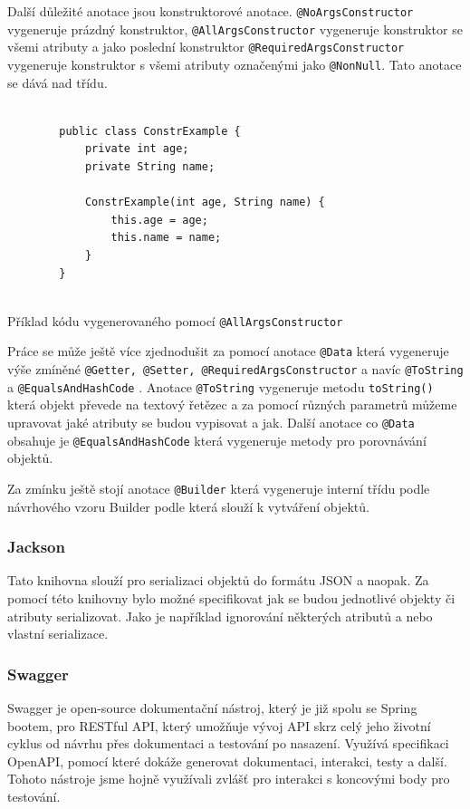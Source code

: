 Další důležité anotace jsou konstruktorové anotace. \texttt{@NoArgsConstructor} vygeneruje prázdný konstruktor, \texttt{@AllArgsConstructor} vygeneruje konstruktor se všemi atributy  a jako poslední konstruktor \texttt{@RequiredArgsConstructor} vygeneruje konstruktor s všemi atributy označenými jako \texttt{@NonNull}. Tato anotace se dává nad třídu. \cite{lombok:constructor} 

\begin{listing}[H]
    \begin{verbatim}

        public class ConstrExample {
            private int age;
            private String name;

            ConstrExample(int age, String name) {
                this.age = age;
                this.name = name;
            }
        }
    
    \end{verbatim}
    \caption{Příklad kódu vygenerovaného pomocí \texttt{@AllArgsConstructor}}
    \label{code:lombok:constructor}
\end{listing}


Práce se může ještě více zjednodušit za pomocí anotace \texttt{@Data} která vygeneruje výše zmíněné \texttt{@Getter, @Setter, @RequiredArgsConstructor} a navíc \texttt{@ToString} a \texttt{@EqualsAndHashCode} \cite{lombok:data}.
Anotace \texttt{@ToString} vygeneruje metodu \texttt{toString()} která objekt převede na textový řetězec a za pomocí různých parametrů můžeme upravovat jaké atributy se budou vypisovat a jak. Další anotace co \texttt{@Data} obsahuje je \texttt{@EqualsAndHashCode} která vygeneruje metody pro porovnávání objektů.


Za zmínku ještě stojí anotace \texttt{@Builder} která vygeneruje interní třídu podle návrhového vzoru Builder\cite{refactoringGuru:builder} podle která slouží k vytváření objektů. \cite{lombok:builder}

\subsubsection*{Jackson}\label{sec:impl:jackson}
Tato knihovna slouží pro serializaci objektů do formátu JSON  a naopak. Za pomocí této knihovny bylo možné specifikovat jak se budou jednotlivé objekty či atributy serializovat. Jako je například ignorování některých atributů a nebo vlastní serializace.

\subsubsection*{Swagger}\label{sec:impl:swagger}
Swagger je open-source dokumentační nástroj, který je již spolu se Spring bootem, pro RESTful API, který umožňuje vývoj API skrz celý jeho životní cyklus od návrhu přes dokumentaci a testování po nasazení. Využívá specifikaci OpenAPI, pomocí které dokáže generovat dokumentaci, interakci,  testy a další. \cite{swagger:about}
Tohoto nástroje jsme hojně využívali zvlášť pro interakci s koncovými body pro testování.

